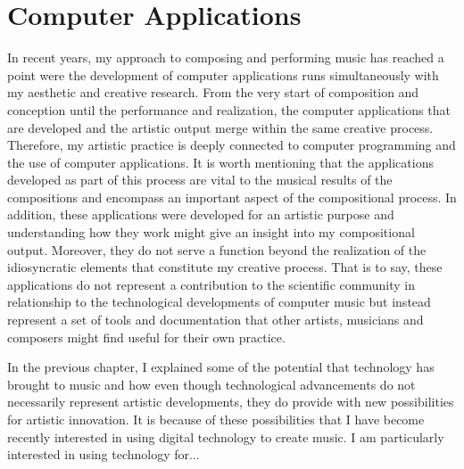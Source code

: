 \chapter{Computer Applications}

In recent years, my approach to composing and performing music has reached a point were the development of computer applications runs simultaneously with my aesthetic and creative research. From the very start of composition and conception until the performance and realization, the computer applications that are developed and the artistic output merge within the same creative process. Therefore, my artistic practice is deeply connected to computer programming and the use of computer applications. It is worth mentioning that the applications developed as part of this process are vital to the musical results of the compositions and encompass an important aspect of the compositional process. In addition, these applications were developed for an artistic purpose and understanding how they work might give an insight into my compositional output. Moreover, they do not serve a function beyond the realization of the idiosyncratic elements that constitute my creative process. That is to say, these applications do not represent a contribution to the scientific community in relationship to the technological developments of computer music but instead represent a set of tools and documentation that other artists, musicians and composers might find useful for their own practice.

In the previous chapter, I explained some of the potential that technology has brought to music and how even though technological advancements do not necessarily represent artistic developments, they do provide with new possibilities for artistic innovation. It is because of these possibilities that I have become recently interested in using digital technology to create music. I am particularly interested in using technology for... 
 
